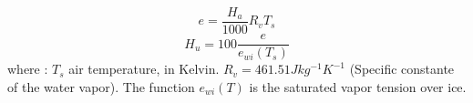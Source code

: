\[
e = \frac{H_{a}}{1000} R_v T_{s}
\]
\[
H_{u} = 100 \frac{e}{e_{wi}(T_{s})}
\]
where :\newline
$T_{s}$ air temperature, in Kelvin. \newline
$R_v = 461.51 J kg^{-1} K^{-1}$ (Specific constante of the water vapor).\newline
The function $e_{wi}(T)$ is the saturated vapor tension over ice.

